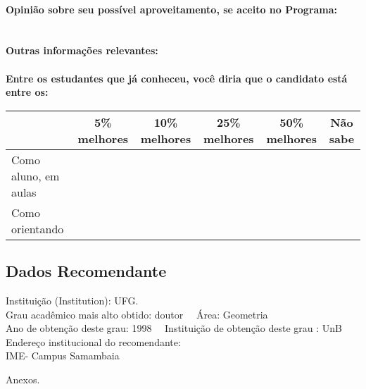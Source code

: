 \documentclass[11pt]{article}
\begin{document}
\\
\textbf{Opinião sobre seu possível aproveitamento, se aceito no Programa:}
\\\\ 
\\
\textbf{Outras informações relevantes:} \\
\\[0.3cm]
\textbf{Entre os estudantes que já conheceu, você diria que o candidato está entre os:}
\\
\begin{tabular}{|l|c|c|c|c|c|}
\hline
 & 5\% melhores & 10\% melhores & 25\% melhores & 50\% melhores & Não sabe \\
\hline
Como aluno, em aulas &  &  &  &  & \\
\hline
Como orientando &  &  &  &  & \\
\hline
\end{tabular}
\subsection*{Dados Recomendante} 
	Instituição (Institution): UFG.
\\ 
	Grau acadêmico mais alto obtido: doutor
	\ \ Área: Geometria
	\\
	Ano de obtenção deste grau: 1998
	\ \ 
	Instituição de obtenção deste grau : UnB
	\\ 
	Endereço institucional do recomendante: \\ IME- Campus Samambaia 
\begin{center}
Anexos.
\end{center}
\end{document}
